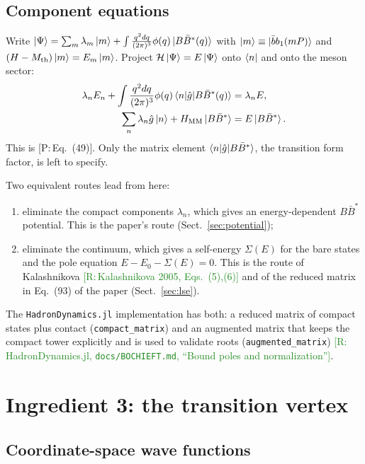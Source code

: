 \documentclass[11pt,a4paper]{article}
\newcommand{\tagP}[1]{\textcolor{blue!65!black}{\textsf{\small[P:\,#1]}}}
\newcommand{\tagR}[1]{\textcolor{ForestGreen}{\textsf{\small[R:\,#1]}}}
\newcommand{\tagD}{\textcolor{orange!85!black}{\textsf{\small[D]}}}
\newcommand{\bbar}{\bar b b}
\newcommand{\BBst}{B\bar B^*}
\newcommand{\Mth}{M_{\rm th}}
\begin{document}
\subsection{Component equations}

\begin{derbox}[Component equations \tagD]
Write $\ket{\Psi}=\sum_m\lambda_m\ket{m}+\int\frac{q^2dq}{(2\pi)^3}\phi(q)\ket{\BBst(q)}$ with $\ket{m}\equiv\ket{\bbar_1(mP)}$ and $(H-\Mth)\ket{m}=E_m\ket{m}$. Project $\mathcal H\ket\Psi=E\ket\Psi$ onto $\bra{n}$ and onto the meson sector:
\begin{align}
\lambda_nE_n+\int\frac{q^2dq}{(2\pi)^3}\phi(q)\braket{n|\hat g|\BBst(q)}&=\lambda_nE,\label{eq:sys1}\\
\sum_n\lambda_n\hat g\ket{n}+H_{\rm MM}\ket{\BBst}&=E\ket{\BBst}.\label{eq:sys2}
\end{align}
This is \tagP{Eq.~(49)}. Only the matrix element $\braket{n|\hat g|\BBst}$, the transition form factor, is left to specify.
\end{derbox}

Two equivalent routes lead from here:
\begin{enumerate}
\item eliminate the compact components $\lambda_n$, which gives an energy-dependent $\BBst$ potential. This is the paper's route (Sect.~\ref{sec:potential});
\item eliminate the continuum, which gives a self-energy $\Sigma(E)$ for the bare states and the pole equation $E-E_0-\Sigma(E)=0$. This is the route of Kalashnikova \tagR{Kalashnikova 2005, Eqs.~(5),(6)} and of the reduced matrix in Eq.~(93) of the paper (Sect.~\ref{sec:lse}).
\end{enumerate}
The \texttt{HadronDynamics.jl} implementation has both: a reduced matrix of compact states plus contact (\texttt{compact\_matrix}) and an augmented matrix that keeps the compact tower explicitly and is used to validate roots (\texttt{augmented\_matrix}) \tagR{HadronDynamics.jl, \texttt{docs/BOCHIEFT.md}, ``Bound poles and normalization''}.

\section{Ingredient 3: the transition vertex}
\label{sec:vertex}

\subsection{Coordinate-space wave functions}
\end{document}
